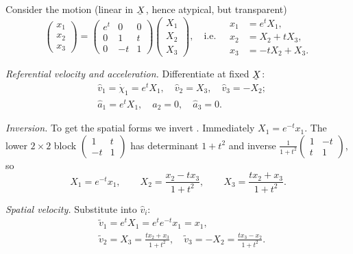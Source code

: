 \begin{example}\label{ex:motion}
Consider the motion (linear in $\bX$, hence atypical, but transparent)
\begin{equation}
   \begin{pmatrix}x_1\\x_2\\x_3\end{pmatrix}
   =\begin{pmatrix}e^{t}&0&0\\0&1&t\\0&-t&1\end{pmatrix}
   \begin{pmatrix}X_1\\X_2\\X_3\end{pmatrix},\quad\text{i.e.}\quad
   \begin{aligned}x_1&=e^{t}X_1,\\ x_2&=X_2+tX_3,\\ x_3&=-tX_2+X_3.\end{aligned}
   \tag{2.30}\label{eq:2.30}
\end{equation}

\emph{Referential velocity and acceleration.} Differentiate at fixed $\bX$:
\[
\begin{aligned}
   &\hat v_1=\dot\chi_1=e^{t}X_1,\quad \hat v_2=X_3,\quad \hat v_3=-X_2;\\
   &\hat a_1=e^{t}X_1,\quad \hat a_2=0,\quad \hat a_3=0 .
\end{aligned}
\]

\emph{Inversion.} To get the spatial forms we invert . Immediately
$X_1=e^{-t}x_1$. The lower $2\times2$ block $\left(\begin{smallmatrix}1&t\\
-t&1\end{smallmatrix}\right)$ has determinant $1+t^2$ and inverse
$\tfrac{1}{1+t^2}\left(\begin{smallmatrix}1&-t\\t&1\end{smallmatrix}\right)$,
so
\begin{equation}
   X_1=e^{-t}x_1,\qquad
   X_2=\frac{x_2-t x_3}{1+t^2},\qquad
   X_3=\frac{t x_2+x_3}{1+t^2}. \tag{2.31}\label{eq:2.31}
\end{equation}

\emph{Spatial velocity.} Substitute  into $\hat v_i$:
\[
\begin{aligned}
   &\tilde v_1=e^{t}X_1=e^{t}e^{-t}x_1=x_1,\\
   &\tilde v_2=X_3=\frac{t x_2+x_3}{1+t^2},\quad
    \tilde v_3=-X_2=\frac{t x_3-x_2}{1+t^2}.
\end{aligned}
\]


\end{example}
